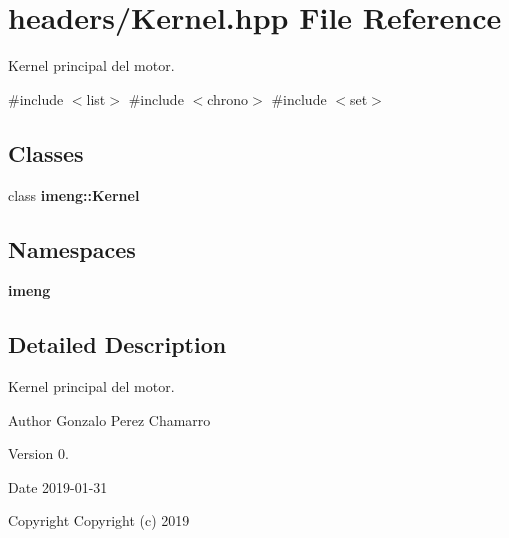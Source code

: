 \section{headers/\+Kernel.hpp File Reference}
\label{_kernel_8hpp}


Kernel principal del motor.  


{\ttfamily \#include $<$list$>$}\newline
{\ttfamily \#include $<$chrono$>$}\newline
{\ttfamily \#include $<$set$>$}\newline
\subsection*{Classes}
\begin{DoxyCompactItemize}
\item 
class \textbf{ imeng\+::\+Kernel}
\end{DoxyCompactItemize}
\subsection*{Namespaces}
\begin{DoxyCompactItemize}
\item 
 \textbf{ imeng}
\end{DoxyCompactItemize}


\subsection{Detailed Description}
Kernel principal del motor. 

\begin{DoxyAuthor}{Author}
Gonzalo Perez Chamarro 
\end{DoxyAuthor}
\begin{DoxyVersion}{Version}
0. 
\end{DoxyVersion}
\begin{DoxyDate}{Date}
2019-\/01-\/31
\end{DoxyDate}
\begin{DoxyCopyright}{Copyright}
Copyright (c) 2019 
\end{DoxyCopyright}
